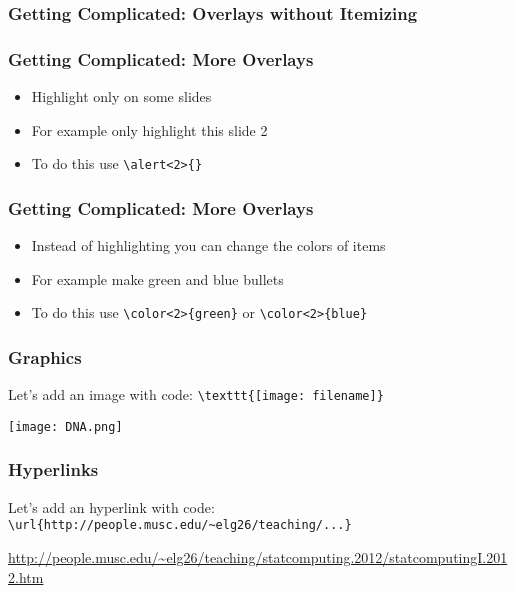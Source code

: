 \documentclass{beamer}
\begin{document}
\begin{frame}[fragile]
  \frametitle{Getting Complicated: Overlays without Itemizing}
\end{frame}

\begin{frame}[fragile]
  \frametitle{Getting Complicated: More Overlays}
  \begin{itemize}
  \item Highlight only on some slides
  \item \alert<2>{For example only highlight this slide 2}
  \item To do this use \verb|\alert<2>{}|
  \end{itemize}
\end{frame}

\begin{frame}[fragile]
  \frametitle{Getting Complicated: More Overlays}
  \begin{itemize}
  \item Instead of highlighting you can change the colors of items
  \item {}For example make green and blue bullets
  \item {}To do this use \verb|\color<2>{green}| or \verb||
  \end{itemize}
\end{frame}

\begin{frame}[fragile]
  \frametitle{Graphics}
 Let's add an image with code:
 \verb|\texttt{[image: filename]}|
 \begin{center}
  \texttt{[image: DNA.png]}
  \end{center}
\end{frame}

\begin{frame}[fragile]
  \frametitle{Hyperlinks}
 Let's add an hyperlink with code:
 \verb|\url{http://people.musc.edu/~elg26/teaching/...}|
 \begin{center}
  \color{blue}
  \url{http://people.musc.edu/~elg26/teaching/statcomputing.2012/statcomputingI.2012.htm}
  \end{center}
\end{frame}
\end{document}
